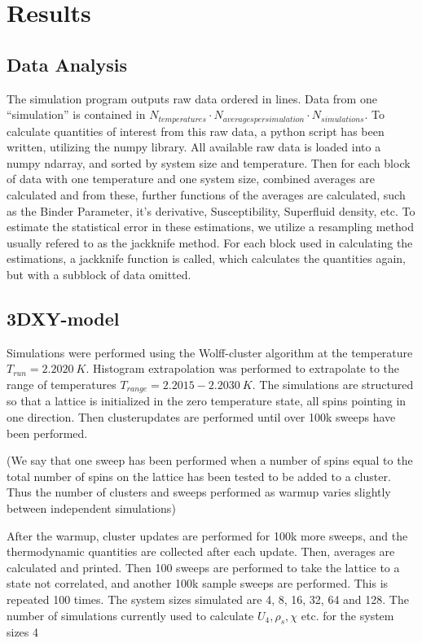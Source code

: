 %
\section{Results}
\subsection{Data Analysis}
The simulation program outputs raw data ordered in lines. Data from one ``simulation'' is contained in $N_{temperatures} \cdot N_{averages per simulation} \cdot N_{simulations}$.
To calculate quantities of interest from this raw data, a python script has been written, utilizing the numpy library. All available raw data is loaded into a numpy ndarray, and sorted by system size and temperature. Then for each block of data with one temperature and one system size, combined averages are calculated and from these, further functions of the averages are calculated, such as the Binder Parameter, it's derivative, Susceptibility, Superfluid density, etc. To estimate the statistical error in these estimations, we utilize a resampling method usually refered to as the jackknife method. For each block used in calculating the estimations, a jackknife function is called, which calculates the quantities again, but with a subblock of data omitted.
\subsection{3DXY-model}
Simulations were performed using the Wolff-cluster algorithm at the temperature $T_{run} = 2.2020~K$. Histogram extrapolation was performed to extrapolate to the range of temperatures $T_{range} = 2.2015-2.2030 ~ K$.
The simulations are structured so that a lattice is initialized in the zero temperature state, all spins pointing in one direction. Then clusterupdates are performed until over 100k sweeps have been performed.

(We say that one sweep has been performed when a number of spins equal to the total number of spins on the lattice has been tested to be added to a cluster.
Thus the number of clusters and sweeps performed as warmup varies slightly between independent simulations)

After the warmup, cluster updates are performed for 100k more sweeps, and the thermodynamic quantities are collected after each update. Then, averages are calculated and printed. Then 100 sweeps are performed to take the lattice to a state not correlated, and another 100k sample sweeps are performed. This is repeated 100 times. The system sizes simulated are 4, 8, 16, 32, 64 and 128. 
The number of simulations currently used to calculate $U_4, \rho_s, \chi $ etc. for the system sizes 4

